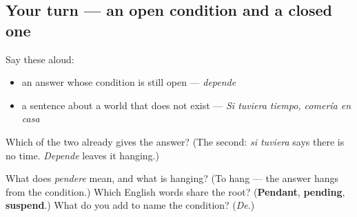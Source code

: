 \subsection*{Your turn — an open condition and a closed one}
Say these aloud:

\begin{itemize}
\raggedright
  \item an answer whose condition is still open — \emph{depende}
  \item a sentence about a world that does not exist — \emph{Si tuviera tiempo, comería en casa}
\end{itemize}

Which of the two already gives the answer? (The second: \emph{si tuviera} says there is no time. \emph{Depende} leaves it hanging.)

\begin{tcolorbox}[breakable,colback=teal!4,colframe=teal!35!black,title={Before you move on}]
What does \emph{pendere} mean, and what is hanging? (To hang — the answer hangs from the condition.) Which English words share the root? (\textbf{Pendant}, \textbf{pending}, \textbf{suspend}.) What do you add to name the condition? (\emph{De}.)
\end{tcolorbox}
